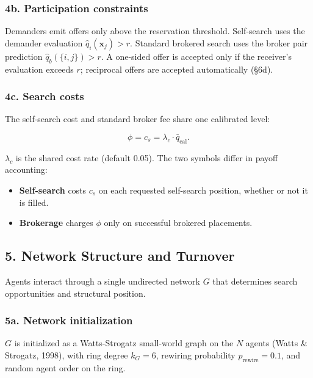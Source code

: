\documentclass[11pt]{article}
\providecommand{\tightlist}{%
  \setlength{\itemsep}{0pt}\setlength{\parskip}{0pt}}
\begin{document}
\subsubsection{4b. Participation constraints}\label{b.-participation-constraints}

Demanders emit offers only above the reservation threshold. Self-search uses the demander evaluation \(\hat{q}_{i}(\mathbf{x}_j)>r\). Standard brokered search uses the broker pair prediction \(\hat{q}_b(\{i,j\})>r\). A one-sided offer is accepted only if the receiver's evaluation exceeds \(r\); reciprocal offers are accepted automatically (§6d).

\subsubsection{4c. Search costs}\label{c.-search-costs}

The self-search cost and standard broker fee share one calibrated level:

\[
\phi = c_s = \lambda_c \cdot \bar{q}_{\text{cal}}.
\]

\(\lambda_c\) is the shared cost rate (default 0.05). The two symbols differ in payoff accounting:

\begin{itemize}
\tightlist
\item
  \textbf{Self-search} costs \(c_s\) on each requested self-search position, whether or not it is filled.
\item
  \textbf{Brokerage} charges \(\phi\) only on successful brokered placements.
\end{itemize}

\subsection{5. Network Structure and Turnover}\label{network-structure-and-turnover}

Agents interact through a single undirected network \(G\) that determines search opportunities and structural position.

\subsubsection{5a. Network initialization}\label{a.-network-initialization}

\(G\) is initialized as a Watts-Strogatz small-world graph on the \(N\) agents (Watts \& Strogatz, 1998), with ring degree \(k_G = 6\), rewiring probability \(p_{\text{rewire}} = 0.1\), and random agent order on the ring.
\end{document}
